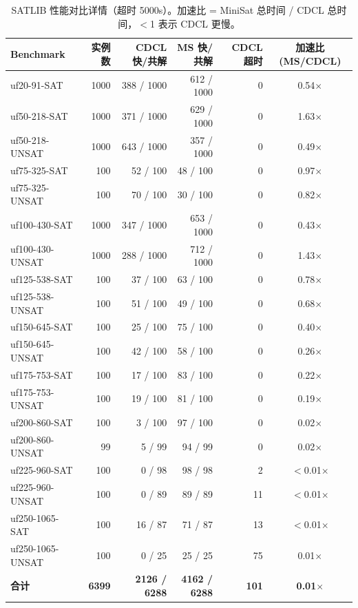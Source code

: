 \documentclass[12pt,a4paper]{article}
\begin{document}
\begin{table}[H]
\centering
\renewcommand{\arraystretch}{1.25}
\footnotesize
\begin{tabular}{lrrrrc}
\toprule
\textbf{Benchmark} & \textbf{实例数} & \textbf{CDCL 快/共解} & \textbf{MS 快/共解} & \textbf{CDCL 超时} & \textbf{加速比 (MS/CDCL)} \\
\midrule
uf20-91-SAT       & 1000 & 388 / 1000 & 612 / 1000 & 0  & 0.54$\times$ \\
uf50-218-SAT      & 1000 & 371 / 1000 & 629 / 1000 & 0  & 1.63$\times$ \\
uf50-218-UNSAT    & 1000 & 643 / 1000 & 357 / 1000 & 0  & 0.49$\times$ \\
uf75-325-SAT      & 100  & 52 / 100   & 48 / 100   & 0  & 0.97$\times$ \\
uf75-325-UNSAT    & 100  & 70 / 100   & 30 / 100   & 0  & 0.82$\times$ \\
uf100-430-SAT     & 1000 & 347 / 1000 & 653 / 1000 & 0  & 0.43$\times$ \\
uf100-430-UNSAT   & 1000 & 288 / 1000 & 712 / 1000 & 0  & 1.43$\times$ \\
uf125-538-SAT     & 100  & 37 / 100   & 63 / 100   & 0  & 0.78$\times$ \\
uf125-538-UNSAT   & 100  & 51 / 100   & 49 / 100   & 0  & 0.68$\times$ \\
uf150-645-SAT     & 100  & 25 / 100   & 75 / 100   & 0  & 0.40$\times$ \\
uf150-645-UNSAT   & 100  & 42 / 100   & 58 / 100   & 0  & 0.26$\times$ \\
uf175-753-SAT     & 100  & 17 / 100   & 83 / 100   & 0  & 0.22$\times$ \\
uf175-753-UNSAT   & 100  & 19 / 100   & 81 / 100   & 0  & 0.19$\times$ \\
uf200-860-SAT     & 100  & 3 / 100    & 97 / 100   & 0  & 0.02$\times$ \\
uf200-860-UNSAT   & 99   & 5 / 99     & 94 / 99    & 0  & 0.02$\times$ \\
uf225-960-SAT     & 100  & 0 / 98     & 98 / 98    & 2  & $<$0.01$\times$ \\
uf225-960-UNSAT   & 100  & 0 / 89     & 89 / 89    & 11 & $<$0.01$\times$ \\
uf250-1065-SAT    & 100  & 16 / 87    & 71 / 87    & 13 & $<$0.01$\times$ \\
uf250-1065-UNSAT  & 100  & 0 / 25     & 25 / 25    & 75 & 0.01$\times$ \\
\midrule
\textbf{合计}     & \textbf{6399} & \textbf{2126 / 6288} & \textbf{4162 / 6288} & \textbf{101} & \textbf{0.01$\times$} \\
\bottomrule
\end{tabular}
\caption{SATLIB 性能对比详情（超时 5000s）。加速比 = MiniSat 总时间 / CDCL 总时间，$<$1 表示 CDCL 更慢。}
\label{tab:satlib_perf}
\end{table}
\end{document}
